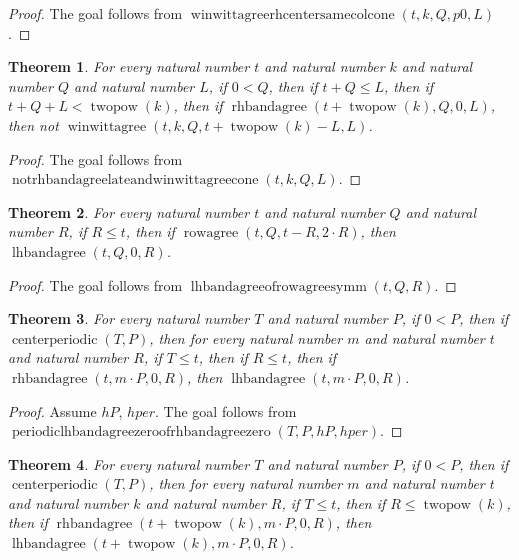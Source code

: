 \documentclass[11pt]{article}
\newtheorem{theorem}{Theorem}[section]
\theoremstyle{definition}
\begin{document}
\begin{proof}
The goal follows from \(\operatorname{winwittagreerhcentersamecolcone}(t, k, Q, p0, L)\).
\end{proof}
\begin{theorem}
\label{ll:paper:not-rhbandagree-late-and-winwittagree-cone}
For every natural number \(t\) and natural number \(k\) and natural number \(Q\) and natural number \(L\), if \(0 < Q\), then if \(t + Q \le L\), then if \(t + Q + L < \operatorname{twopow}(k)\), then if \(\operatorname{rhbandagree}(t + \operatorname{twopow}(k), Q, 0, L)\), then not \(\operatorname{winwittagree}(t, k, Q, t + \operatorname{twopow}(k) - L, L)\).
\end{theorem}
\begin{proof}
The goal follows from \(\operatorname{notrhbandagreelateandwinwittagreecone}(t, k, Q, L)\).
\end{proof}
\begin{theorem}
\label{ll:paper:lhbandagree-of-rowagree-symm}
For every natural number \(t\) and natural number \(Q\) and natural number \(R\), if \(R \le t\), then if \(\operatorname{rowagree}(t, Q, t - R, 2 \cdot R)\), then \(\operatorname{lhbandagree}(t, Q, 0, R)\).
\end{theorem}
\begin{proof}
The goal follows from \(\operatorname{lhbandagreeofrowagreesymm}(t, Q, R)\).
\end{proof}
\begin{theorem}
\label{ll:paper:periodic-lhbandagree-zero-of-rhbandagree-zero}
For every natural number \(T\) and natural number \(P\), if \(0 < P\), then if \(\operatorname{centerperiodic}(T, P)\), then for every natural number \(m\) and natural number \(t\) and natural number \(R\), if \(T \le t\), then if \(R \le t\), then if \(\operatorname{rhbandagree}(t, m \cdot P, 0, R)\), then \(\operatorname{lhbandagree}(t, m \cdot P, 0, R)\).
\end{theorem}
\begin{proof}
Assume \(hP\), \(hper\).
The goal follows from \(\operatorname{periodiclhbandagreezeroofrhbandagreezero}(T, P, hP, hper)\).
\end{proof}
\begin{theorem}
\label{ll:paper:periodic-lhbandagree-late-of-rhbandagree-late}
For every natural number \(T\) and natural number \(P\), if \(0 < P\), then if \(\operatorname{centerperiodic}(T, P)\), then for every natural number \(m\) and natural number \(t\) and natural number \(k\) and natural number \(R\), if \(T \le t\), then if \(R \le \operatorname{twopow}(k)\), then if \(\operatorname{rhbandagree}(t + \operatorname{twopow}(k), m \cdot P, 0, R)\), then \(\operatorname{lhbandagree}(t + \operatorname{twopow}(k), m \cdot P, 0, R)\).
\end{theorem}
\end{document}
